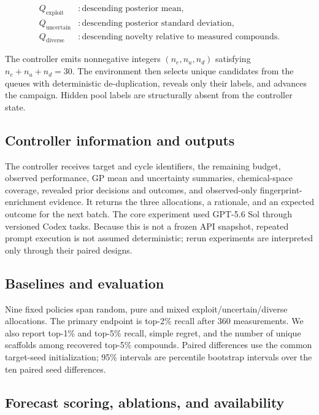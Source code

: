 \documentclass{article}
\begin{document}
\begin{align}
Q_{\mathrm{exploit}} &: \text{descending posterior mean}, \\
Q_{\mathrm{uncertain}} &: \text{descending posterior standard deviation}, \\
Q_{\mathrm{diverse}} &: \text{descending novelty relative to measured compounds}.
\end{align}

The controller emits nonnegative integers $(n_e,n_u,n_d)$ satisfying $n_e+n_u+n_d=30$. The environment then selects unique candidates from the queues with deterministic de-duplication, reveals only their labels, and advances the campaign. Hidden pool labels are structurally absent from the controller state.

\subsection{Controller information and outputs}

The controller receives target and cycle identifiers, the remaining budget, observed performance, GP mean and uncertainty summaries, chemical-space coverage, revealed prior decisions and outcomes, and observed-only fingerprint-enrichment evidence. It returns the three allocations, a rationale, and an expected outcome for the next batch. The core experiment used GPT-5.6 Sol through versioned Codex tasks. Because this is not a frozen API snapshot, repeated prompt execution is not assumed deterministic; rerun experiments are interpreted only through their paired designs.

\subsection{Baselines and evaluation}

Nine fixed policies span random, pure and mixed exploit/uncertain/diverse allocations. The primary endpoint is top-2\% recall after 360 measurements. We also report top-1\% and top-5\% recall, simple regret, and the number of unique scaffolds among recovered top-5\% compounds. Paired differences use the common target-seed initialization; 95\% intervals are percentile bootstrap intervals over the ten paired seed differences.

\subsection{Forecast scoring, ablations, and availability}
\end{document}
